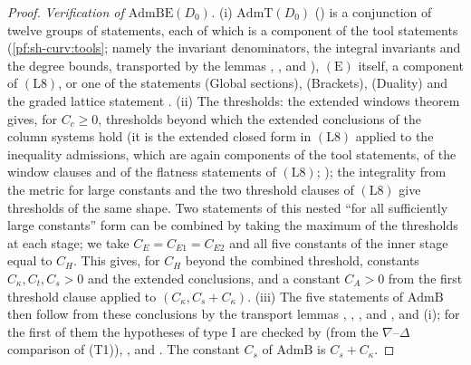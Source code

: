 \begin{proof}
\emph{Verification of $\mathrm{AdmBE}(D_0)$.}
(i) $\mathrm{AdmT}(D_0)$ () is a conjunction of twelve
groups of statements, each of which is a component of the tool statements (\cref{pf:sh-curv:tools}; namely the invariant
denominators, the integral invariants and the degree bounds, transported by the lemmas
, , and ),
$(\mathrm E)$ itself, a component of $(\mathrm L8)$, or one of the statements (Global sections), (Brackets), (Duality) and the
graded lattice statement .
(ii) The thresholds: the extended windows theorem gives, for $C_c\ge0$, thresholds beyond which the extended conclusions of
the column systems hold (it is the extended closed form in $(\mathrm L8)$ applied to the inequality admissions, which are
again components of the tool statements, of the window clauses and of the flatness statements of $(\mathrm L8)$;
); the integrality from the metric for large constants and
the two threshold clauses of $(\mathrm L8)$ give thresholds of the same shape. Two statements of this nested ``for all
sufficiently large constants'' form can be combined by taking the maximum of the thresholds at each stage; we take
$C_E=C_{E1}=C_{E2}$ and all five constants of the inner stage equal to $C_H$. This gives, for $C_H$ beyond the combined
threshold, constants $C_\kappa,C_t,C_s>0$ and the extended conclusions, and a constant $C_A>0$
from the first threshold clause applied to $(C_\kappa,C_s+C_\kappa)$.
(iii) The five statements of $\mathrm{AdmB}$ then follow from these conclusions by the transport lemmas
, , , and ,
and (i); for the first of them the hypotheses of type I are checked by
 (from the $\nabla$--$\Delta$ comparison of
(T1)), ,
 and
. The constant $C_s$ of $\mathrm{AdmB}$ is
$C_s+C_\kappa$.
\end{proof}

